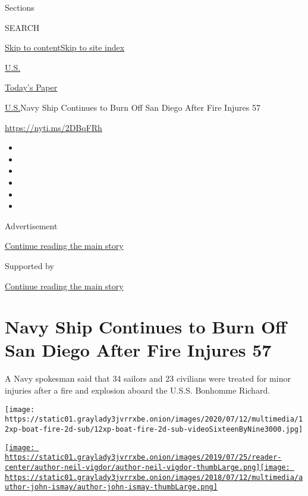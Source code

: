 Sections

SEARCH

\protect\hyperlink{site-content}{Skip to
content}\protect\hyperlink{site-index}{Skip to site index}

\href{https://www.nytimes3xbfgragh.onion/section/us}{U.S.}

\href{https://myaccount.nytimes3xbfgragh.onion/auth/login?response_type=cookie\&client_id=vi}{}

\href{https://www.nytimes3xbfgragh.onion/section/todayspaper}{Today's
Paper}

\href{/section/us}{U.S.}\textbar{}Navy Ship Continues to Burn Off San
Diego After Fire Injures 57

\url{https://nyti.ms/2DBqFRh}

\begin{itemize}
\item
\item
\item
\item
\item
\item
\end{itemize}

Advertisement

\protect\hyperlink{after-top}{Continue reading the main story}

Supported by

\protect\hyperlink{after-sponsor}{Continue reading the main story}

\hypertarget{navy-ship-continues-to-burn-off-san-diego-after-fire-injures-57}{%
\section{Navy Ship Continues to Burn Off San Diego After Fire Injures
57}\label{navy-ship-continues-to-burn-off-san-diego-after-fire-injures-57}}

A Navy spokesman said that 34 sailors and 23 civilians were treated for
minor injuries after a fire and explosion aboard the U.S.S. Bonhomme
Richard.

\texttt{[image: https://static01.graylady3jvrrxbe.onion/images/2020/07/12/multimedia/12xp-boat-fire-2d-sub/12xp-boat-fire-2d-sub-videoSixteenByNine3000.jpg]}

\href{https://www.nytimes3xbfgragh.onion/by/neil-vigdor}{\texttt{[image: https://static01.graylady3jvrrxbe.onion/images/2019/07/25/reader-center/author-neil-vigdor/author-neil-vigdor-thumbLarge.png]}}\href{https://www.nytimes3xbfgragh.onion/by/john-ismay}{\texttt{[image: https://static01.graylady3jvrrxbe.onion/images/2018/07/12/multimedia/author-john-ismay/author-john-ismay-thumbLarge.png]}}

